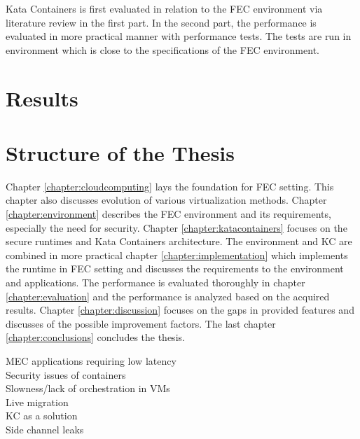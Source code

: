 Kata Containers is first evaluated in relation to the FEC environment via literature review in the first part. In the second part, the performance is evaluated in more practical manner with performance tests. The tests are run in environment which is close to the specifications of the FEC environment.

\section{Results}
\label{section:intro_results}


\section{Structure of the Thesis}
\label{section:intro_structure}

Chapter \ref{chapter:cloudcomputing} lays the foundation for FEC setting. This chapter also discusses evolution of various virtualization methods. Chapter \ref{chapter:environment} describes the FEC environment and its requirements, especially the need for security. Chapter \ref{chapter:katacontainers} focuses on the secure runtimes and Kata Containers architecture. The environment and KC are combined in more practical chapter \ref{chapter:implementation} which implements the runtime in FEC setting and discusses the requirements to the environment and applications. The performance is evaluated thoroughly in chapter \ref{chapter:evaluation} and the performance is analyzed based on the acquired results. Chapter \ref{chapter:discussion} focuses on the gaps in provided features and discusses of the possible improvement factors. The last chapter \ref{chapter:conclusions} concludes the thesis.

MEC applications requiring low latency \\
Security issues of containers \\
Slowness/lack of orchestration in VMs \\
Live migration \\
KC as a solution \\

Side channel leaks \\
